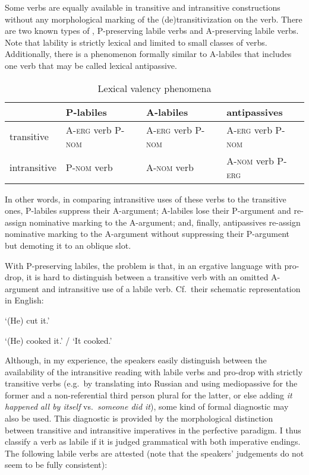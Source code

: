\documentclass[output=paper]{langsci/langscibook}
\begin{document}
Some verbs are equally available in transitive and intransitive
constructions without any morphological marking of the
(de)transitivization on the verb. There are two known types of , P-preserving labile verbs and A-preserving labile verbs. Note
that lability is strictly lexical and limited to small classes of verbs.
Additionally, there is a phenomenon formally similar to A-labiles that
includes one verb that may be called lexical antipassive.

\begin{table}[h]
\caption{Lexical valency phenomena}

\begin{tabular}{@{}llll@{}}
\toprule
& P-labiles & A-labiles & antipassives\tabularnewline \midrule
transitive & A-\textsc{erg} verb P-\textsc{nom} & A-\textsc{erg} verb P-\textsc{nom} & A-\textsc{erg} verb P-\textsc{nom} \tabularnewline
intransitive & P-\textsc{nom} verb & A-\textsc{nom} verb & A-\textsc{nom} verb P-\textsc{erg} \tabularnewline
\bottomrule
\end{tabular}
\end{table}

In other words, in comparing intransitive uses of these verbs to the
transitive ones, P-labiles suppress their A-argument; A-labiles lose
their P-argument and re-assign nominative marking to the A-argument;
and, finally, antipassives re-assign nominative marking to the
A-argument without suppressing their \mbox{P-argument} but demoting it to an
oblique slot.

With P-preserving labiles, the problem is that, in an ergative language
with pro-drop, it is hard to distinguish between a transitive verb with
an omitted \mbox{A-argument} and intransitive use of a labile verb. Cf.\ their
schematic representation in English:

\ea %
`(He) cut it.'

\ex %
`(He) cooked it.' / `It cooked.'
\z

Although, in my experience, the speakers easily distinguish between the
availability of the intransitive reading with labile verbs and pro-drop
with strictly transitive verbs (e.g.\ by translating into Russian and
using mediopassive for the former and a non-referential third person
plural for the latter, or else adding \emph{it happened} \emph{all by
itself} vs.\ \emph{someone did it}), some kind of formal diagnostic may
also be used. This diagnostic is provided by the morphological
distinction between transitive and intransitive imperatives in the
perfective paradigm. I thus classify a verb as labile if it is judged
grammatical with both imperative endings. The following labile verbs are
attested (note that the speakers' judgements do not seem to be fully consistent):
\end{document}
